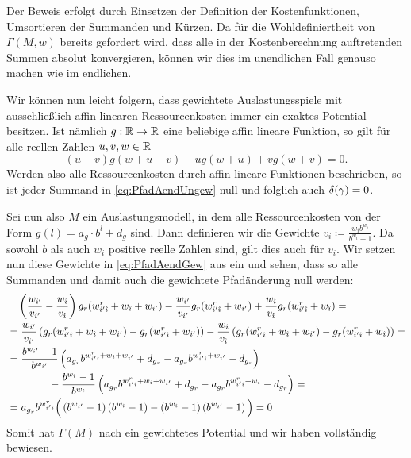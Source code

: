 Der Beweis erfolgt durch Einsetzen der Definition der Kostenfunktionen, Umsortieren der Summanden und Kürzen. Da für die Wohldefiniertheit von $\Gamma(M, w)$ bereits gefordert wird, dass alle in der Kostenberechnung auftretenden Summen absolut konvergieren, können wir dies im unendlichen Fall genauso machen wie im endlichen.

Wir können nun leicht folgern, dass gewichtete Auslastungsspiele mit ausschließlich affin linearen Ressourcenkosten immer ein exaktes Potential besitzen. Ist nämlich $g: \mathbb{R}\to \mathbb{R}$ eine beliebige affin lineare Funktion, so gilt für alle reellen Zahlen $u,v,w \in \mathbb{R}$
	\[(u-v)g(w+u+v) - u g(w+u) + v g(w+v) = 0.\]
Werden also alle Ressourcenkosten durch affin lineare Funktionen beschrieben, so ist jeder Summand in \eqref{eq:PfadAendUngew} null und folglich auch $\delta(\gamma) = 0$.

Sei nun also $M$ ein Auslastungsmodell, in dem alle Ressourcenkosten von der Form $g(l) = a_g\cdot b^l + d_g$ sind. Dann definieren wir die Gewichte $v_i \coloneqq \frac{w_i b^{w_i}}{b^{w_i}-1}$. Da sowohl $b$ als auch $w_i$ positive reelle Zahlen sind, gilt dies auch für $v_i$. Wir setzen nun diese Gewichte in \eqref{eq:PfadAendGew} aus  ein und sehen, dass so alle Summanden und damit auch die gewichtete Pfadänderung null werden:
\begin{align*}
	&\quad \left(\frac{w_{i'}}{v_{i'}} - \frac{w_{\hat{\imath}}}{v_{\hat{\imath}}}\right) g_r({w^r_{{i'}{\hat{\imath}}}} + w_{\hat{\imath}} + w_{i'}) - \frac{w_{i'}}{v_{i'}} g_r({w^r_{{i'}{\hat{\imath}}}} + w_{i'})  + \frac{w_{\hat{\imath}}}{v_{\hat{\imath}}} g_r({w^r_{{i'}{\hat{\imath}}}} + w_{\hat{\imath}}) =\\
	&= \frac{w_{i'}}{v_{i'}}\left(g_r({w^r_{{i'}{\hat{\imath}}}} + w_{\hat{\imath}} + w_{i'}) - g_r({w^r_{{i'}{\hat{\imath}}}} + w_{i'})\right) - \frac{w_{\hat{\imath}}}{v_{\hat{\imath}}}\left(g_r({w^r_{{i'}{\hat{\imath}}}} + w_{\hat{\imath}} + w_{i'}) - g_r({w^r_{{i'}{\hat{\imath}}}} + w_{\hat{\imath}})\right) =\\
	&= \frac{b^{w_{i'}}-1}{b^{w_{i'}}}\left(a_{g_r}b^{{w^r_{{i'}{\hat{\imath}}}} + w_{\hat{\imath}} + w_{i'}}+d_{g_r} - a_{g_r} b^{{w^r_{{i'}{\hat{\imath}}}} + w_{i'}} - d_{g_r}\right) \\
	&  \hspace{4em} -\frac{b^{w_{\hat{\imath}}}-1}{b^{w_{\hat{\imath}}}}\left(a_{g_r}b^{{w^r_{{i'}{\hat{\imath}}}} + w_{\hat{\imath}} + w_{i'}}+d_{g_r} - a_{g_r} b^{{w^r_{{i'}{\hat{\imath}}}} + w_{i}} - d_{g_r}\right) =\\
	&= a_{g_r}b^{w^r_{{i'}{\hat{\imath}}}} \Big(\left(b^{w_{i'}}-1\right)\left(b^{w_{\hat{\imath}}}-1\right) - \left(b^{w_{\hat{\imath}}}-1\right)\left(b^{w_{i'}}-1\right)\Big) = 0
\end{align*}
Somit hat $\Gamma(M)$ nach  ein gewichtetes Potential und wir haben  vollständig bewiesen.

